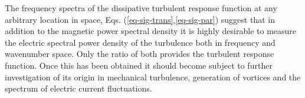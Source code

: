 \documentclass[ ]{copernicus2}
\begin{document}
{The frequency spectra of the dissipative turbulent response function at any arbitrary location in space,  Eqs. (\ref{eq-sig-trans},\ref{eq-sig-par}) suggest that in addition to the magnetic power spectral density it is highly desirable to measure the electric spectral power density of the turbulence both in frequency and wavenumber space. Only the ratio of both provides the  turbulent response function. Once this has been obtained it should become subject to further investigation of its origin in mechanical turbulence, generation of vortices and the spectrum of electric current fluctuations. 


}
\end{document}
